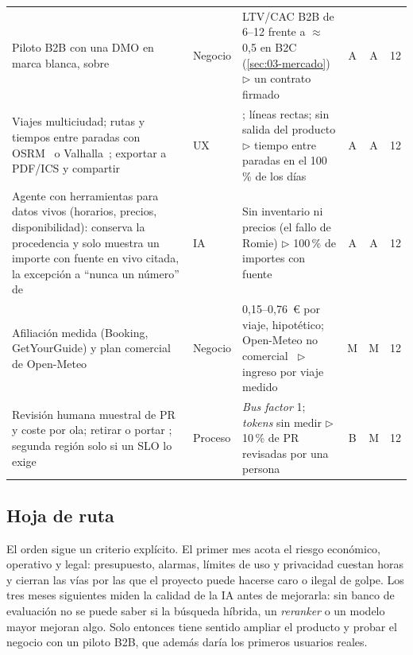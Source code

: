 \begin{table}[tb]
\begin{tabularx}{\textwidth}{@{}>{\raggedright\arraybackslash}p{7.2cm}lYccc@{}}
Piloto B2B con una DMO en marca blanca, sobre  & Negocio & LTV/CAC B2B de 6--12 frente a $\approx$0,5 en B2C (\cref{sec:03-mercado}) $\triangleright$ un contrato firmado & A & A & 12 \\
Viajes multiciudad; rutas y tiempos entre paradas con OSRM~\cite{cr:osrm} o Valhalla~\cite{cr:valhalla}; exportar a PDF/ICS y compartir & UX & ; líneas rectas; sin salida del producto $\triangleright$ tiempo entre paradas en el 100\,\% de los días & A & A & 12 \\
Agente con herramientas para datos vivos (horarios, precios, disponibilidad): conserva la procedencia y solo muestra un importe con fuente en vivo citada, la excepción a ``nunca un número'' de  & IA & Sin inventario ni precios (el fallo de Romie) $\triangleright$ 100\,\% de importes con fuente & A & A & 12 \\
Afiliación medida (Booking, GetYourGuide) y plan comercial de Open-Meteo & Negocio & 0,15--0,76~€ por viaje, hipotético; Open-Meteo no comercial~\cite{mk:openmeteo} $\triangleright$ ingreso por viaje medido & M & M & 12 \\
Revisión humana muestral de PR y coste por ola; retirar o portar ; segunda región solo si un SLO lo exige & Proceso & \emph{Bus factor} 1; \emph{tokens} sin medir $\triangleright$ 10\,\% de PR revisadas por una persona & B & M & 12 \\
\bottomrule
\end{tabularx}
\end{table}

\subsection{Hoja de ruta}

El orden sigue un criterio explícito. El primer mes acota el riesgo económico, operativo y legal:
presupuesto, alarmas, límites de uso y privacidad cuestan horas y cierran las vías por las que el
proyecto puede hacerse caro o ilegal de golpe. Los tres meses siguientes miden la calidad de la IA
antes de mejorarla: sin banco de evaluación no se puede saber si la búsqueda híbrida, un
\emph{reranker} o un modelo mayor mejoran algo. Solo entonces tiene sentido ampliar el producto y
probar el negocio con un piloto B2B, que además daría los primeros usuarios reales.
